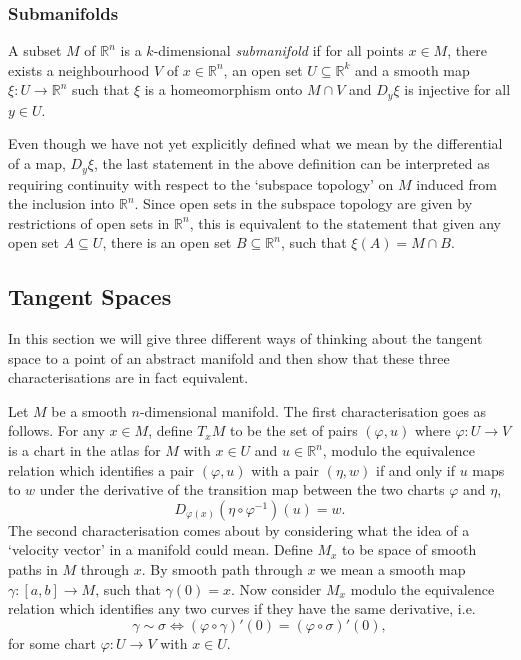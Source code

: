 \documentclass[12pt,a4paper]{article}
\begin{document}
\subsubsection{Submanifolds}
\begin{definition}
A subset $M$ of $\mathbb{R}^n$ is a $k$-dimensional \textit{submanifold} if for all points $x\in M$, there exists a neighbourhood $V$ of $x\in\mathbb{R}^n$, an open set $U\subseteq\mathbb{R}^k$ and a smooth map $\xi:U\to\mathbb{R}^n$ such that $\xi$ is a homeomorphism onto $M\cap V$ and $D_y\xi$ is injective for all $y\in U$. 
\end{definition}
Even though we have not yet explicitly defined what we mean by the differential of a map, $D_y\xi$, the last statement in the above definition can be interpreted as requiring continuity with respect to the `subspace topology' on $M$ induced from the inclusion into $\mathbb{R}^n$. Since open sets in the subspace topology are given by restrictions of open sets in $\mathbb{R}^n$, this is equivalent to the statement that given any open set $A\subseteq U$, there is an open set $B\subseteq\mathbb{R}^n$, such that $\xi(A)=M\cap B$.
\subsection{Tangent Spaces}

In this section we will give three different ways of thinking about the tangent space to a point of an abstract manifold and then show that these three characterisations are in fact equivalent.

Let $M$ be a smooth $n$-dimensional manifold. The first characterisation goes as follows. For any $x\in M$, define $T_xM$ to be the set of pairs $(\varphi,u)$ where $\varphi:U\to V$ is a chart in the atlas for $M$ with $x\in U$ and $u\in\mathbb{R}^n$, modulo the equivalence relation which identifies a pair $(\varphi,u)$ with a pair $(\eta,w)$ if and only if $u$ maps to $w$ under the derivative of the transition map between the two charts $\varphi$ and $\eta$,
\[
D_{\varphi(x)}(\eta\circ\varphi^{-1})(u)=w.
\]
The second characterisation comes about by considering what the idea of a `velocity vector' in a manifold could mean. Define $M_x$ to be space of smooth paths in $M$ through $x$. By smooth path through $x$ we mean a smooth map $\gamma:[a,b]\to M$, such that $\gamma(0)=x$. Now consider $M_x$ modulo the equivalence relation which identifies any two curves if they have the same derivative, i.e. 
\[
\gamma\sim\sigma\Leftrightarrow(\varphi\circ\gamma)'(0)=(\varphi\circ\sigma)'(0),
\] 
for some chart $\varphi:U\to V$ with $x\in U$. 
\end{document}
